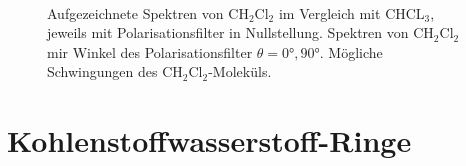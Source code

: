 \documentclass[../bericht.tex]{subfiles}
\begin{document}
\begin{figure}
{
            \label{fig:ch2cl2}
          } \\
          \caption[Aufgezeichnete Spektren von $\mathrm{CH_2Cl_2}$ und mögliche Schwingungen des Moleküls.]{\protect{} Aufgezeichnete Spektren von $\mathrm{CH_2Cl_2}$ im Vergleich mit $\mathrm{CHCL_3}$, jeweils mit Polarisationsfilter in Nullstellung. \protect{} Spektren von $\mathrm{CH_2Cl_2}$ mir Winkel des Polarisationsfilter $\theta=\ang{0},\ang{90}$. \protect{} Mögliche Schwingungen des $\mathrm{CH_2Cl_2}$-Moleküls. \cite{herzberg}}
          \label{fig:ch2cl2-analyse}
        \end{figure}


    \section{Kohlenstoffwasserstoff-Ringe}
\end{document}
